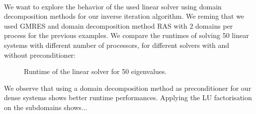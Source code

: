 \paragraph{}
We want to explore the behavior of the used linear solver using domain decomposition methods for our inverse iteration algorithm.
We reming that we used GMRES and domain decomposition method RAS with 2 domains per process for the previous examples.
We compare the runtimes of solving 50 linear systems with different number of processors, for different solvers with and without preconditioner:

\begin{figure}[H]
 \centering
 
 \caption{Runtime of the linear solver for 50 eigenvalues.}
\end{figure}

We observe that using a domain decomposition method as preconditioner for our dense systems shows better runtime performances.
Applying the LU factorisation on the subdomains shows...

